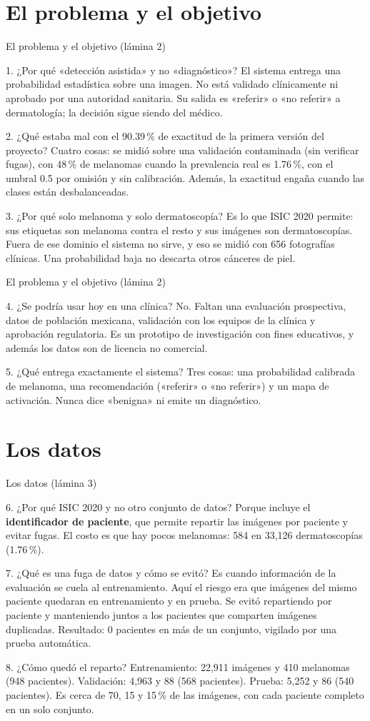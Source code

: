 \documentclass[aspectratio=169,10pt]{beamer}
\newcommand{\qa}[2]{\begin{block}{#1}\footnotesize #2\end{block}}
\begin{document}
\section{El problema y el objetivo}
\begin{frame}{El problema y el objetivo (lámina 2)}
  \qa{1. ¿Por qué «detección asistida» y no «diagnóstico»?}{
    El sistema entrega una probabilidad estadística sobre una imagen. No está validado clínicamente ni aprobado por una autoridad sanitaria. Su salida es «referir» o «no referir» a dermatología; la decisión sigue siendo del médico.}
  \qa{2. ¿Qué estaba mal con el 90.39\,\% de exactitud de la primera versión del proyecto?}{
    Cuatro cosas: se midió sobre una validación contaminada (sin verificar fugas), con 48\,\% de melanomas cuando la prevalencia real es 1.76\,\%, con el umbral 0.5 por omisión y sin calibración. Además, la exactitud engaña cuando las clases están desbalanceadas.}
  \qa{3. ¿Por qué solo melanoma y solo dermatoscopía?}{
    Es lo que ISIC 2020 permite: sus etiquetas son melanoma contra el resto y sus imágenes son dermatoscopías. Fuera de ese dominio el sistema no sirve, y eso se midió con 656 fotografías clínicas. Una probabilidad baja no descarta otros cánceres de piel.}
\end{frame}

\begin{frame}{El problema y el objetivo (lámina 2)}
  \qa{4. ¿Se podría usar hoy en una clínica?}{
    No. Faltan una evaluación prospectiva, datos de población mexicana, validación con los equipos de la clínica y aprobación regulatoria. Es un prototipo de investigación con fines educativos, y además los datos son de licencia no comercial.}
  \qa{5. ¿Qué entrega exactamente el sistema?}{
    Tres cosas: una probabilidad calibrada de melanoma, una recomendación («referir» o «no referir») y un mapa de activación. Nunca dice «benigna» ni emite un diagnóstico.}
\end{frame}

\section{Los datos}
\begin{frame}{Los datos (lámina 3)}
  \qa{6. ¿Por qué ISIC 2020 y no otro conjunto de datos?}{
    Porque incluye el \textbf{identificador de paciente}, que permite repartir las imágenes por paciente y evitar fugas. El costo es que hay pocos melanomas: 584 en 33,126 dermatoscopías (1.76\,\%).}
  \qa{7. ¿Qué es una fuga de datos y cómo se evitó?}{
    Es cuando información de la evaluación se cuela al entrenamiento. Aquí el riesgo era que imágenes del mismo paciente quedaran en entrenamiento y en prueba. Se evitó repartiendo por paciente y manteniendo juntos a los pacientes que comparten imágenes duplicadas. Resultado: 0 pacientes en más de un conjunto, vigilado por una prueba automática.}
  \qa{8. ¿Cómo quedó el reparto?}{
    Entrenamiento: 22,911 imágenes y 410 melanomas (948 pacientes). Validación: 4,963 y 88 (568 pacientes). Prueba: 5,252 y 86 (540 pacientes). Es cerca de 70, 15 y 15\,\% de las imágenes, con cada paciente completo en un solo conjunto.}
\end{frame}
\end{document}
